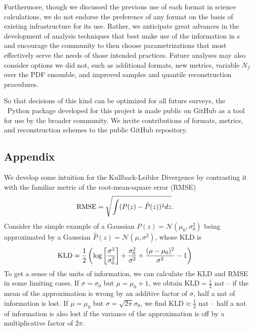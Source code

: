 Furthermore, though we discussed the previous use of each format in science 
calculations, we do not endorse the preference of any format on the basis of 
existing infrastructure for its use.
Rather, we anticipate great advances in the development of analysis techniques 
that best make use of the information in \pz s and encourage the community to 
then choose parametrizations that most effectively serve the needs of those 
intended practices.
Future analyses may also consider options we did not, such as additional 
formats, new metrics, variable $N_{f}$ over the PDF ensemble, and improved 
samples and quantile reconstruction procedures.

So that decisions of this kind can be optimized for all future surveys, the 
\qp\ Python package developed for this project is made public on GitHub as a 
tool for use by the broader community.
We invite contributions of formats, metrics, and reconstruction schemes to the 
public GitHub repository.


\subsection*{Appendix}

We develop some intuition for the Kullback-Leibler Divergence by contrasting it 
with the familiar metric of the root-mean-square error (RMSE)
\begin{align}
\eqlabel{eq:rmse}
\mathrm{RMSE} &= \sqrt{\int (P(z) - \hat{P}(z))^{2} dz}.
\end{align}
Consider the simple example of a Gaussian $P(z) = \mathcal{N}(\mu_{0}, 
\sigma_{0}^{2})$ being approximated by a Gaussian $\hat{P}(z) = 
\mathcal{N}(\mu, \sigma^{2})$, whose KLD is
\begin{align}
\eqlabel{eq:gaussian}
\mathrm{KLD} &= 
\frac{1}{2}\left(\log\left[\frac{\sigma^{2}}{\sigma_{0}^{2}}\right] + 
\frac{\sigma_{0}^{2}}{\sigma^{2}} + \frac{(\mu-\mu_{0})^{2}}{\sigma^{2}} - 
1\right)
\end{align}
To get a sense of the units of information, we can calculate the KLD and RMSE 
in some limiting cases.
If $\sigma=\sigma_{0}$ but $\mu=\mu_{0}+1$, we obtain 
$\mathrm{KLD}=\frac{1}{2}$ nat -- if the mean of the approximation is wrong by 
an additive factor of $\sigma$, half a nat of information is lost.
If $\mu=\mu_{0}$ but $\sigma=\sqrt{2\pi}\sigma_{0}$, we find 
$\mathrm{KLD}\approx\frac{1}{2}$ nat -- half a nat of information is also lost 
if the variance of the approximation is off by a multiplicative factor of 
$2\pi$.

